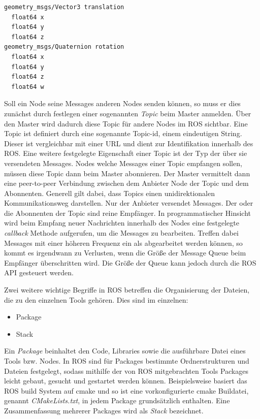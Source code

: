\begin{lstlisting}[caption=ROS transformation Message, label=lst:transform]
geometry_msgs/Vector3 translation
  float64 x
  float64 y
  float64 z
geometry_msgs/Quaternion rotation
  float64 x
  float64 y
  float64 z
  float64 w
\end{lstlisting}

Soll ein Node seine Messages anderen Nodes senden
können, so muss er dies zunächst durch festlegen einer sogenannten
\textit{Topic} beim Master anmelden. Über den Master wird
dadurch diese Topic für andere Nodes im ROS sichtbar. Eine
Topic ist definiert durch eine sogenannte Topic-id, einem
eindeutigen String. Dieser ist vergleichbar mit einer URL und dient zur
Identifikation innerhalb des ROS. Eine weitere festgelegte
Eigenschaft einer Topic ist der Typ der über sie versendeten
Messages. Nodes welche Messages einer
Topic empfangen sollen, müssen diese Topic dann beim
Master abonnieren. Der Master vermittelt dann eine
peer-to-peer Verbindung zwischen dem Anbieter Node der Topic und dem
Abonnenten. Generell gilt dabei, dass Topics einen unidirektionalen
Kommunikationsweg darstellen. Nur der Anbieter versendet Messages.
Der oder die Abonnenten der Topic sind reine Empfänger. 
In programmatischer Hinsicht wird beim Empfang neuer Nachrichten innerhalb des
Nodes eine festgelegte \textit{callback} Methode aufgerufen, um die
Messages zu bearbeiten. Treffen dabei Messages mit einer höheren
Frequenz ein als abgearbeitet werden können, so kommt es irgendwann zu
Verlusten, wenn die Größe der Message Queue beim Empfänger überschritten
wird. Die Größe der Queue kann jedoch durch die ROS API gesteuert werden.  

Zwei weitere wichtige Begriffe in ROS betreffen die Organisierung der
Dateien, die zu den einzelnen Tools gehören. Dies sind im einzelnen:

\begin{itemize}
  \item Package
  \item Stack
\end{itemize}

Ein \textit{Package} beinhaltet den Code, Libraries sowie die ausführbare Datei
eines Tools bzw. Nodes. In ROS sind für Packages bestimmte
Ordnerstrukturen und Dateien festgelegt, sodass mithilfe der von ROS
mitgebrachten Tools Packages leicht gebaut, gesucht und gestartet
werden können. Beispielsweise basiert das ROS build System auf cmake und so ist
eine vorkonfigurierte cmake Buildatei, genannt \textit{CMakeLists.txt}, in jedem
Package grundsätzlich enthalten. Eine Zusammenfassung mehrerer
Packages wird als \textit{Stack} bezeichnet. 

